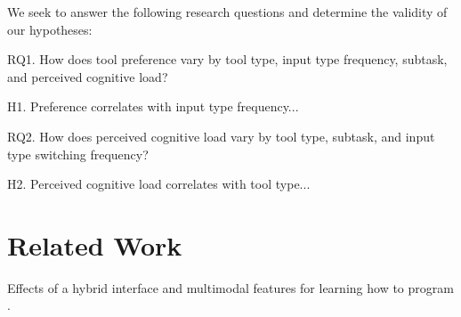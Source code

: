 \documentclass[11pt, oneside]{article}   	%
\begin{document}

We seek to answer the following research questions and determine the validity of our hypotheses:

RQ1. How does tool preference vary by tool type, input type frequency, subtask, and perceived cognitive load?

H1. Preference correlates with input type frequency...

RQ2. How does perceived cognitive load vary by tool type, subtask, and input type switching frequency?

H2. Perceived cognitive load correlates with tool type...

\section{Related Work}
Effects of a hybrid interface and multimodal features for learning how to program \cite{unal2021effects, grafsgaard2014additive}.
\end{document}
